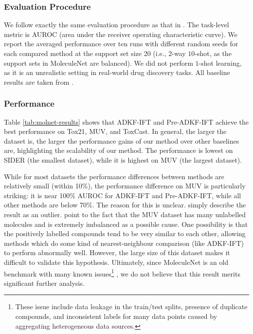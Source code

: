         \subsubsection{Evaluation Procedure}
        We follow exactly the same evaluation procedure as that in \citet{wang2021property,Hu*2020Strategies,guo2021few}.
        The task-level metric is AUROC (area under the receiver operating characteristic curve).
        We report the averaged performance over ten runs with different random seeds for each compared method at the
        support set size 20 (i.e., $2$-way $10$-shot, as the support sets in MoleculeNet are balanced).
        We did not perform $1$-shot learning, as it is an unrealistic setting in real-world drug discovery tasks.
        All baseline results are taken from \citet{wang2021property}.
        
        \subsubsection{Performance}
        Table \ref{tab:molnet-results} shows that ADKF-IFT and Pre-ADKF-IFT achieve the best performance on
        Tox21, MUV, and ToxCast. In general, the larger the dataset is, the larger the performance gains
        of our method over other baselines are, highlighting the scalability of our method.
        The performance is lowest on SIDER (the smallest dataset),
        while it is highest on MUV (the largest dataset).

        While for most datasets the performance differences between methods are relatively small
        (within 10\%),
        the performance difference on MUV is particularly striking:
        it is near 100\% AUROC for ADKF-IFT and Pre-ADKF-IFT,
        while all other methods are below 70\%.
        The reason for this is unclear.
        \citet[page~6]{wu2024pacia} simply describe the result as an outlier.
        \citet[page~8]{wang2024knowledge} point to the
        fact that the MUV dataset has many unlabelled molecules and is extremely imbalanced
        as a possible cause.
        One possibility is that the positively labelled compounds tend to be very similar to each other,
        allowing methods which do some kind of nearest-neighbour comparison (like ADKF-IFT)
        to perform abnormally well.
        However, the large size of this dataset makes it difficult to validate this hypothesis.
        Ultimately, since MoleculeNet is an old benchmark with many known issues\footnote{
            These issue include data leakage in the train/test splits, presence of duplicate compounds,
            and inconsistent labels for many data points caused by aggregating heterogeneous data sources.
        }
        \citep{pat_walters_better_benchmarks},
        we do not believe that this result merits significant further analysis.
        
